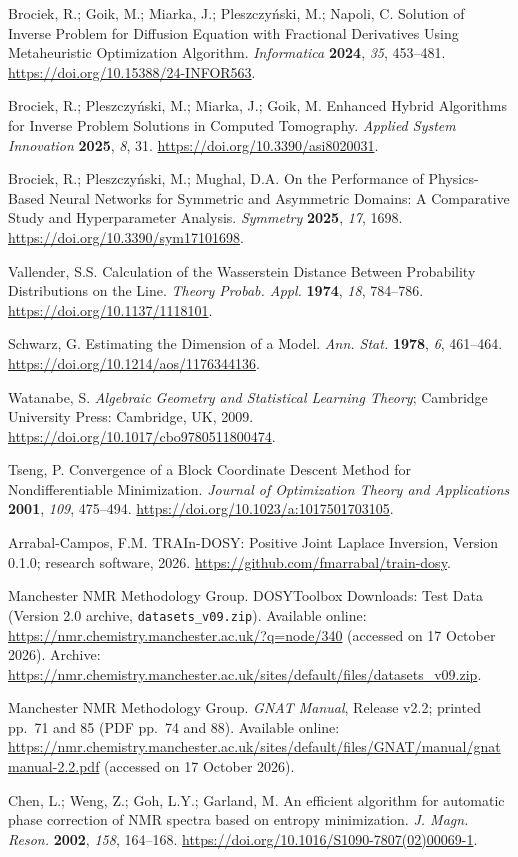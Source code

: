 Brociek, R.; Goik, M.; Miarka, J.; Pleszczy\'nski, M.; Napoli, C. Solution of Inverse Problem for Diffusion Equation with Fractional Derivatives Using Metaheuristic Optimization Algorithm. \emph{Informatica} \textbf{2024}, \emph{35}, 453--481. \url{https://doi.org/10.15388/24-INFOR563}.

Brociek, R.; Pleszczy\'nski, M.; Miarka, J.; Goik, M. Enhanced Hybrid Algorithms for Inverse Problem Solutions in Computed Tomography. \emph{Applied System Innovation} \textbf{2025}, \emph{8}, 31. \url{https://doi.org/10.3390/asi8020031}.

Brociek, R.; Pleszczy\'nski, M.; Mughal, D.A. On the Performance of Physics-Based Neural Networks for Symmetric and Asymmetric Domains: A Comparative Study and Hyperparameter Analysis. \emph{Symmetry} \textbf{2025}, \emph{17}, 1698. \url{https://doi.org/10.3390/sym17101698}.

Vallender, S.S. Calculation of the Wasserstein Distance Between Probability Distributions on the Line. \emph{Theory Probab. Appl.} \textbf{1974}, \emph{18}, 784--786. \url{https://doi.org/10.1137/1118101}.

Schwarz, G. Estimating the Dimension of a Model. \emph{Ann. Stat.} \textbf{1978}, \emph{6}, 461--464. \url{https://doi.org/10.1214/aos/1176344136}.

Watanabe, S. \emph{Algebraic Geometry and Statistical Learning Theory}; Cambridge University Press: Cambridge, UK, 2009. \url{https://doi.org/10.1017/cbo9780511800474}.

Tseng, P. Convergence of a Block Coordinate Descent Method for Nondifferentiable Minimization. \emph{Journal of Optimization Theory and Applications} \textbf{2001}, \emph{109}, 475--494. \url{https://doi.org/10.1023/a:1017501703105}.

Arrabal-Campos, F.M. TRAIn-DOSY: Positive Joint Laplace Inversion, Version 0.1.0; research software, 2026. \url{https://github.com/fmarrabal/train-dosy}.

Manchester NMR Methodology Group. DOSYToolbox Downloads: Test Data (Version 2.0 archive, \texttt{datasets\_v09.zip}).
Available online: \url{https://nmr.chemistry.manchester.ac.uk/?q=node/340}
(accessed on 17 October 2026).
Archive: \url{https://nmr.chemistry.manchester.ac.uk/sites/default/files/datasets_v09.zip}.

Manchester NMR Methodology Group. \textit{GNAT Manual}, Release v2.2; printed pp.~71 and 85 (PDF pp.~74 and 88).
Available online: \url{https://nmr.chemistry.manchester.ac.uk/sites/default/files/GNAT/manual/gnatmanual-2.2.pdf}
(accessed on 17 October 2026).

Chen, L.; Weng, Z.; Goh, L.Y.; Garland, M.
An efficient algorithm for automatic phase correction of NMR spectra based on entropy minimization.
\textit{J. Magn. Reson.} \textbf{2002}, \textit{158}, 164--168.
\url{https://doi.org/10.1016/S1090-7807(02)00069-1}.
